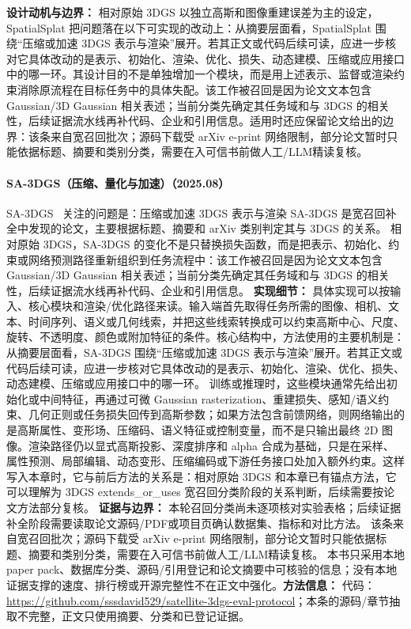 \textbf{设计动机与边界：} 相对原始 3DGS 以独立高斯和图像重建误差为主的设定，SpatialSplat 把问题落在以下可实现的改动上：从摘要层面看，SpatialSplat 围绕“压缩或加速 3DGS 表示与渲染”展开。若其正文或代码后续可读，应进一步核对它具体改动的是表示、初始化、渲染、优化、损失、动态建模、压缩或应用接口中的哪一环。其设计目的不是单独增加一个模块，而是用上述表示、监督或渲染约束消除原流程在目标任务中的具体失配。该工作被召回是因为论文文本包含 Gaussian/3D Gaussian 相关表述；当前分类先确定其任务域和与 3DGS 的相关性，后续证据流水线再补代码、企业和引用信息。适用时还应保留论文给出的边界：该条来自宽召回批次；源码下载受 arXiv e-print 网络限制，部分论文暂时只能依据标题、摘要和类别分类，需要在入可信书前做人工/LLM精读复核。
\paragraph{SA-3DGS（压缩、量化与加速）（2025.08）}
SA-3DGS~\cite{2508_03017} 关注的问题是：压缩或加速 3DGS 表示与渲染 SA-3DGS 是宽召回补全中发现的论文，主要根据标题、摘要和 arXiv 类别判定其与 3DGS 的关系。
相对原始 3DGS，SA-3DGS 的变化不是只替换损失函数，而是把表示、初始化、约束或网络预测路径重新组织到任务流程中：该工作被召回是因为论文文本包含 Gaussian/3D Gaussian 相关表述；当前分类先确定其任务域和与 3DGS 的相关性，后续证据流水线再补代码、企业和引用信息。
\textbf{实现细节：} 具体实现可以按输入、核心模块和渲染/优化路径来读。输入端首先取得任务所需的图像、相机、文本、时间序列、语义或几何线索，并把这些线索转换成可以约束高斯中心、尺度、旋转、不透明度、颜色或附加特征的条件。核心结构中，方法使用的主要机制是：从摘要层面看，SA-3DGS 围绕“压缩或加速 3DGS 表示与渲染”展开。若其正文或代码后续可读，应进一步核对它具体改动的是表示、初始化、渲染、优化、损失、动态建模、压缩或应用接口中的哪一环。 训练或推理时，这些模块通常先给出初始化或中间特征，再通过可微 Gaussian rasterization、重建损失、感知/语义约束、几何正则或任务损失回传到高斯参数；如果方法包含前馈网络，则网络输出的是高斯属性、变形场、压缩码、语义特征或控制变量，而不是只输出最终 2D 图像。渲染路径仍以显式高斯投影、深度排序和 alpha 合成为基础，只是在采样、属性预测、局部编辑、动态变形、压缩编码或下游任务接口处加入额外约束。这样写入本章时，它与前后方法的关系是：相对原始 3DGS 和本章已有锚点方法，它可以理解为 3DGS extends\_or\_uses 宽召回分类阶段的关系判断，后续需要按论文方法部分复核。
\textbf{证据与边界：} 本轮召回分类尚未逐项核对实验表格；后续证据补全阶段需要读取论文源码/PDF或项目页确认数据集、指标和对比方法。 该条来自宽召回批次；源码下载受 arXiv e-print 网络限制，部分论文暂时只能依据标题、摘要和类别分类，需要在入可信书前做人工/LLM精读复核。 本书只采用本地 paper pack、数据库分类、源码/引用登记和论文摘要中可核验的信息；没有本地证据支撑的速度、排行榜或开源完整性不在正文中强化。\textbf{方法信息：} 代码：\url{https://github.com/sssdavid529/satellite-3dgs-eval-protocol}；本条的源码/章节抽取不完整，正文只使用摘要、分类和已登记证据。
